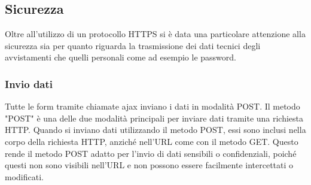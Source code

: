 \documentclass[a4paper,final,12pt]{report}
\begin{document}
\subsection{Sicurezza}
Oltre all'utilizzo di un protocollo HTTPS si è data una particolare attenzione alla sicurezza sia per quanto riguarda la trasmissione dei dati tecnici degli avvistamenti che quelli personali come ad esempio le password.
\subsubsection{Invio dati} 
Tutte le form tramite chiamate ajax inviano i dati in modalità POST. Il metodo "POST" è una delle due modalità principali per inviare dati tramite una richiesta HTTP. Quando si inviano dati utilizzando il metodo POST, essi sono inclusi nella corpo della richiesta HTTP, anziché nell'URL come con il metodo GET. Questo rende il metodo POST adatto per l'invio di dati sensibili o confidenziali, poiché questi non sono visibili nell'URL e non possono essere facilmente intercettati o modificati.
\end{document}
